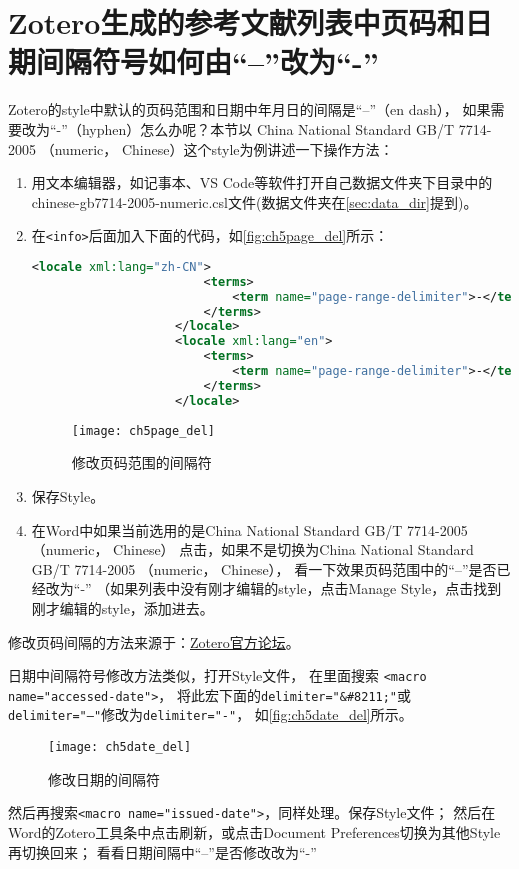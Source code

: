 \documentclass[cn,11pt,chinese]{elegantbook}
\begin{document}
		\section{Zotero生成的参考文献列表中页码和日期间隔符号如何由“–”改为“-”}\label{sec:DashToHyphen}		
			Zotero的style中默认的页码范围和日期中年月日的间隔是“–”（en dash），
			如果需要改为“-”（hyphen）怎么办呢？本节以
			China National Standard GB/T 7714-2005 （numeric， Chinese）这个style为例讲述一下操作方法：
				\begin{enumerate}
					\item 用文本编辑器，如记事本、VS Code等软件打开自己数据文件夹下目录中的
					chinese-gb7714-2005-numeric.csl文件(数据文件夹在\cref{sec:data_dir}提到)。
					\item 在\verb|<info>|后面加入下面的代码，如\autoref{fig:ch5page_del}所示：
					
					\begin{lstlisting}[language=XML]	
					<locale xml:lang="zh-CN">
						<terms>
							<term name="page-range-delimiter">-</term>
						</terms>
					</locale>
					<locale xml:lang="en">
						<terms>
							<term name="page-range-delimiter">-</term>
						</terms>
					</locale>
					\end{lstlisting}				
									\begin{figure}[ht]
										\centering
										\texttt{[image: ch5page\_del]}
										\caption{修改页码范围的间隔符}
										\label{fig:ch5page_del}
									\end{figure}
					\item 保存Style。
					\item 在Word中如果当前选用的是China National Standard GB/T 7714-2005 （numeric， Chinese）
					点击，如果不是切换为China National Standard GB/T 7714-2005 （numeric， Chinese），
					看一下效果页码范围中的“–”是否已经改为“-”
					（如果列表中没有刚才编辑的style，点击Manage Style，点击\menu{+}找到刚才编辑的style，添加进去。
				\end{enumerate}
				
				修改页码间隔的方法来源于：\href{https://forums.zotero.org/discussion/comment/320230#Comment_320230}
		{Zotero官方论坛}。

		日期中间隔符号修改方法类似，打开Style文件，
		在里面搜索 \verb|<macro name="accessed-date">|，
		将此宏下面的\verb|delimiter="&#8211;"|或\verb|delimiter="–"|修改为\verb|delimiter="-"|，
		如\autoref{fig:ch5date_del}所示。
						\begin{figure}[ht]
							\centering
							\texttt{[image: ch5date\_del]}
							\caption{修改日期的间隔符}
							\label{fig:ch5date_del}
						\end{figure}
		然后再搜索\verb|<macro name="issued-date">|，同样处理。保存Style文件；
		然后在Word的Zotero工具条中点击刷新，或点击Document Preferences切换为其他Style再切换回来；		
		看看日期间隔中“–”是否修改改为“-”
\end{document}
